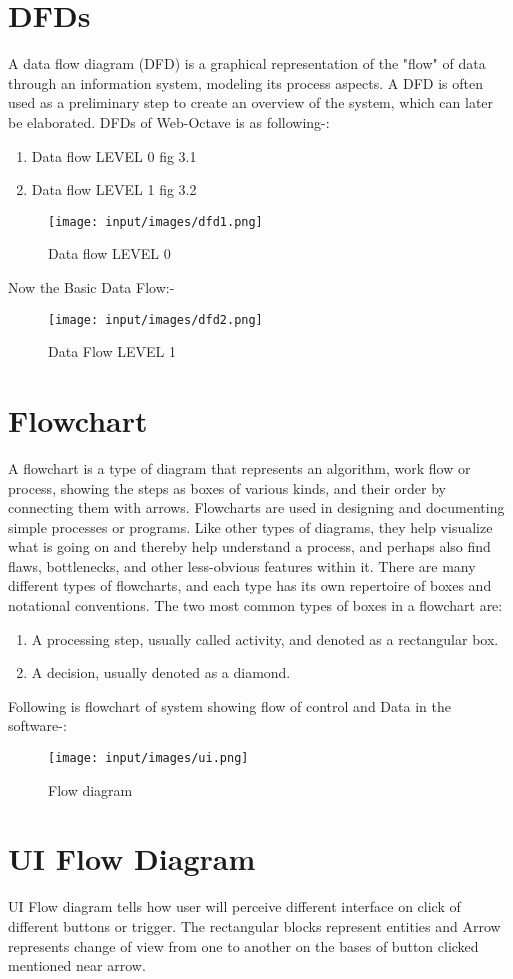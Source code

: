 \section{DFDs}
A data flow diagram (DFD) is a graphical representation of the "flow" of data through an information system, modeling its process aspects. A DFD is often used as a preliminary step to create an overview of the system, which can later be elaborated. DFDs of Web-Octave is as following-:
\begin{enumerate}
\item Data flow LEVEL 0 fig 3.1
\item Data flow LEVEL 1 fig 3.2
\end{enumerate}

\begin{figure}[H]
\centering \texttt{[image: input/images/dfd1.png]}
\caption{Data flow LEVEL 0}
\label{fig:DFDs}
\end{figure}

Now the Basic Data Flow:-

\begin{figure}[H]
\centering \texttt{[image: input/images/dfd2.png]}
\caption{Data Flow LEVEL 1}
\label{fig:DFDs}
\end{figure}
\section{Flowchart}
A flowchart is a type of diagram that represents an algorithm, work flow or process, showing the steps as boxes of various kinds, and their order by connecting them with arrows. 
Flowcharts are used in designing and documenting simple processes or programs. Like other types of diagrams, they help visualize what is going on and thereby help understand a process, and perhaps also find flaws, bottlenecks, and other less-obvious features within it. There are many different types of flowcharts, and each type has its own repertoire of boxes and notational conventions. The two most common types of boxes in a flowchart are:
\begin{enumerate}
\item A processing step, usually called activity, and denoted as a rectangular box.
\item A decision, usually denoted as a diamond.
\end{enumerate}
Following is flowchart of system showing flow of control and Data in the software-:
\begin{figure}[H]
\centering \texttt{[image: input/images/ui.png]}
\caption{ Flow diagram}
\label{fig:UI1}
\end{figure}
\section{UI Flow Diagram}
UI Flow diagram tells how user will perceive different interface on click of different buttons or trigger. The rectangular blocks represent entities and Arrow represents change of view from one to another on the bases of button clicked mentioned near arrow. 

